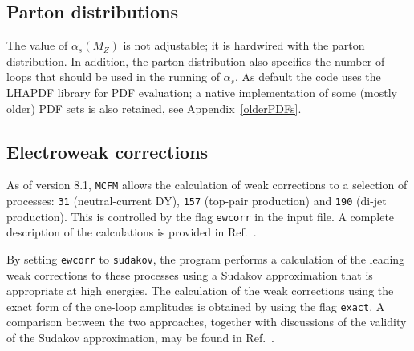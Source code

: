 

\subsection{Parton distributions}
\label{subsec:pdfsets}
The value of $\alpha_s(M_Z)$ is not adjustable; it is hardwired with the
parton distribution. In addition, the parton distribution also specifies
the number of loops that should be used in the running of $\alpha_s$.
As default the code uses the LHAPDF library for PDF evaluation; a native
implementation of some (mostly older) PDF sets is also retained, see
Appendix~\ref{olderPDFs}.

\subsection{Electroweak corrections}
\label{subsec:EW}

As of version 8.1, {\tt MCFM} allows the calculation of weak corrections to a
selection of processes: {\tt 31} (neutral-current DY),
{\tt 157} (top-pair production) and {\tt 190} (di-jet production).
This is controlled by the flag {\tt ewcorr} in the input file.  A complete description
of the calculations is provided in Ref.~\cite{Campbell:2016dks}.

By setting {\tt ewcorr} to {\tt sudakov}, the program performs a calculation of
the leading weak corrections to these processes using a Sudakov approximation that
is appropriate at high energies.   The calculation of the weak corrections using the
exact form of the one-loop amplitudes is obtained by using the flag {\tt exact}.
A comparison between the two approaches, together with discussions of the validity of
the Sudakov approximation, may be found in Ref.~\cite{Campbell:2016dks}.

